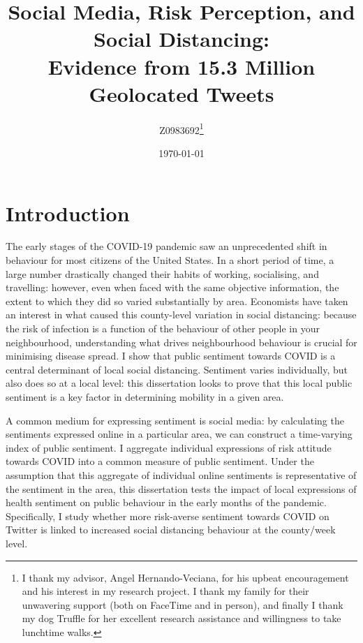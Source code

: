 \documentclass{article}
\author{Z0983692\thanks{I thank my advisor, Angel Hernando-Veciana, for his upbeat encouragement and his interest in my research project. I thank my family for their unwavering support (both on FaceTime and in person), and finally I thank my dog Truffle for her excellent research assistance and willingness to take lunchtime walks.}}
\date{\today}
\newcommand\wordcount{}
\begin{document}
\title{Social Media, Risk Perception, and Social Distancing: \\ Evidence from 15.3 Million Geolocated Tweets}

\maketitle
\wordcount


\newpage
\begin{onehalfspace}
\tableofcontents
\listoffigures
\listoftables
\end{onehalfspace}
\newpage
\section{Introduction}\label{overview}

The early stages of the COVID-19 pandemic saw an unprecedented shift in behaviour for most citizens of the United States. In a short period of time, a large number drastically changed their habits of working, socialising, and travelling: however, even when faced with the same objective information, the extent to which they did so varied substantially by area. Economists have taken an interest in what caused this county-level variation in social distancing: because the risk of infection is a function of the behaviour of other people in your neighbourhood, understanding what drives neighbourhood behaviour is crucial for minimising disease spread. I show that public sentiment towards COVID is a central determinant of local social distancing. Sentiment varies individually, but also does so at a local level: this dissertation looks to prove that this local public sentiment is a key factor in determining mobility in a given area. 

A common medium for expressing sentiment is social media: by calculating the sentiments expressed online in a particular area, we can construct a time-varying index of public sentiment. I aggregate individual expressions of risk attitude towards COVID into a common measure of public sentiment. Under the assumption that this aggregate of individual online sentiments is representative of the sentiment in the area, this dissertation tests the impact of local expressions of health sentiment on public behaviour in the early months of the pandemic. Specifically, I study whether more risk-averse sentiment towards COVID on Twitter is linked to increased social distancing behaviour at the county/week level. 
\end{document}
